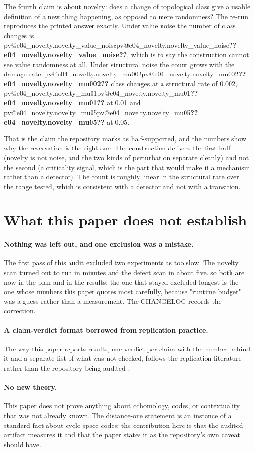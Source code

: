 \documentclass[11pt,a4paper]{article}
\makeatletter
\newcommand{\val}[1]{\ifcsname pv@#1\endcsname\csname pv@#1\endcsname\else\textbf{??#1??}\fi}
\makeatother
\begin{document}
The fourth claim is about novelty: does a change of topological class give a usable definition of
a new thing happening, as opposed to mere randomness? The re-run reproduces the printed answer
exactly. Under value noise the number of class changes is \val{e04_novelty.novelty_value_noise}, which is to say the
construction cannot see value randomness at all. Under structural noise the count grows with the
damage rate: \val{e04_novelty.novelty_mu002} class changes at a structural rate of 0.002, \val{e04_novelty.novelty_mu01} at 0.01 and
\val{e04_novelty.novelty_mu05} at 0.05.

That is the claim the repository marks as half-supported, and the numbers show why the
reservation is the right one. The construction delivers the first half (novelty is not noise, and
the two kinds of perturbation separate cleanly) and not the second (a criticality signal, which
is the part that would make it a mechanism rather than a detector). The count is roughly linear
in the structural rate over the range tested, which is consistent with a detector and not with a
transition.

\section{What this paper does not establish}
\label{sec:not}

\paragraph{Nothing was left out, and one exclusion was a mistake.} The first pass of this audit
excluded two experiments as too slow. The novelty scan turned out to run in minutes and the defect
scan in about five, so both are now in the plan and in the results; the one that stayed excluded
longest is the one whose numbers this paper quotes most carefully, because "runtime budget" was a
guess rather than a measurement. The CHANGELOG records the correction.

\paragraph{A claim-verdict format borrowed from replication practice.} The way this paper reports
results, \citep{osc2015} one verdict per claim with the number behind it and a separate list of
what was not checked, follows the replication literature rather than the repository being audited
\citep{ioannidis2005}.

\paragraph{No new theory.} This paper does not prove anything about cohomology, codes, or
contextuality that was not already known. The distance-one statement is an instance of a standard
fact about cycle-space codes; the contribution here is that the audited artifact measures it and
that the paper states it as the repository's own caveat should have.
\end{document}
